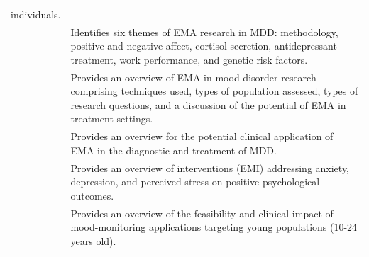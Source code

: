 \documentclass[]{book}
\begin{document}
\begin{longtable}[]{@{}ll@{}}
\begin{minipage}[t]{0.61\columnwidth}
individuals.\strut
\end{minipage}\tabularnewline
\begin{minipage}[t]{0.33\columnwidth}\raggedright\strut
\citet{Telford2012}\strut
\end{minipage} & \begin{minipage}[t]{0.61\columnwidth}\raggedright\strut
Identifies six themes of EMA research in MDD: methodology, positive and
negative affect, cortisol secretion, antidepressant treatment, work
performance, and genetic risk factors.\strut
\end{minipage}\tabularnewline
\begin{minipage}[t]{0.33\columnwidth}\raggedright\strut
\citet{Wenze2010}\strut
\end{minipage} & \begin{minipage}[t]{0.61\columnwidth}\raggedright\strut
Provides an overview of EMA in mood disorder research comprising
techniques used, types of population assessed, types of research
questions, and a discussion of the potential of EMA in treatment
settings.\strut
\end{minipage}\tabularnewline
\begin{minipage}[t]{0.33\columnwidth}\raggedright\strut
\citet{Wichers2011}\strut
\end{minipage} & \begin{minipage}[t]{0.61\columnwidth}\raggedright\strut
Provides an overview for the potential clinical application of EMA in
the diagnostic and treatment of MDD.\strut
\end{minipage}\tabularnewline
\begin{minipage}[t]{0.33\columnwidth}\raggedright\strut
\citet{Versluis2016}\strut
\end{minipage} & \begin{minipage}[t]{0.61\columnwidth}\raggedright\strut
Provides an overview of interventions (EMI) addressing anxiety,
depression, and perceived stress on positive psychological
outcomes.\strut
\end{minipage}\tabularnewline
\begin{minipage}[t]{0.33\columnwidth}\raggedright\strut
\citet{Dubad2018}\strut
\end{minipage} & \begin{minipage}[t]{0.61\columnwidth}\raggedright\strut
Provides an overview of the feasibility and clinical impact of
mood-monitoring applications targeting young populations (10-24 years
old).\strut
\end{minipage}\tabularnewline

\end{longtable}
\end{document}
